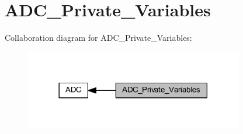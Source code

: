 \hypertarget{group___a_d_c___private___variables}{}\section{A\+D\+C\+\_\+\+Private\+\_\+\+Variables}
\label{group___a_d_c___private___variables}
Collaboration diagram for A\+D\+C\+\_\+\+Private\+\_\+\+Variables\+:
\nopagebreak
\begin{figure}[H]
\begin{center}
\leavevmode
\includegraphics[width=270pt]{group___a_d_c___private___variables}
\end{center}
\end{figure}
